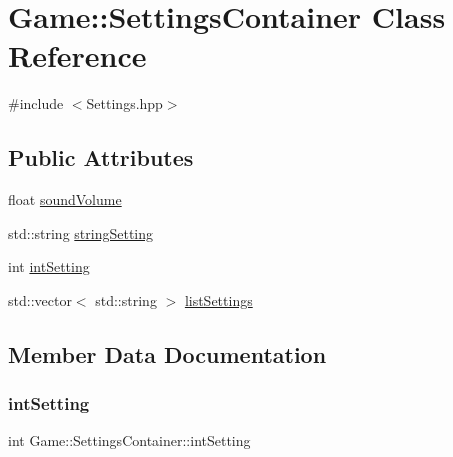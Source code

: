\hypertarget{class_game_1_1_settings_container}{}\section{Game\+:\+:Settings\+Container Class Reference}
\label{class_game_1_1_settings_container}


{\ttfamily \#include $<$Settings.\+hpp$>$}

\subsection*{Public Attributes}
\begin{DoxyCompactItemize}
\item 
float \mbox{\hyperlink{class_game_1_1_settings_container_a27a693595271cf8c08911c1860b39b0b}{sound\+Volume}}
\item 
std\+::string \mbox{\hyperlink{class_game_1_1_settings_container_aca4afe02a4af31e715f795b7408a6dfe}{string\+Setting}}
\item 
int \mbox{\hyperlink{class_game_1_1_settings_container_a335536a6ebf5309d637930ec1883292e}{int\+Setting}}
\item 
std\+::vector$<$ std\+::string $>$ \mbox{\hyperlink{class_game_1_1_settings_container_a9dc30cd4c5a725d00fd9b1385ef62307}{list\+Settings}}
\end{DoxyCompactItemize}


\subsection{Member Data Documentation}
\mbox{\label{class_game_1_1_settings_container_a335536a6ebf5309d637930ec1883292e}} 
\subsubsection{\texorpdfstring{int\+Setting}{intSetting}}
{\footnotesize\ttfamily int Game\+::\+Settings\+Container\+::int\+Setting}

\mbox{\label{class_game_1_1_settings_container_a9dc30cd4c5a725d00fd9b1385ef62307}} 
